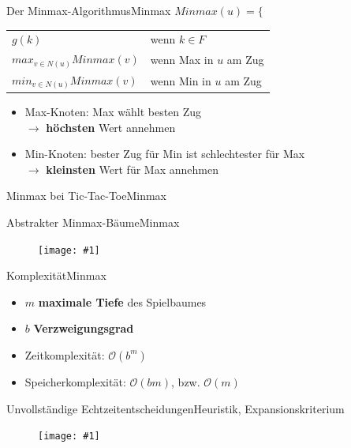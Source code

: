 \documentclass[18pt, aspectratio=169, handout]{beamer}
\newcommand\gw[2]{%
  \begin{figure}[!ht]
  \centering
  \texttt{[image: \#1]}
  {\small#2}
  \end{figure}}
\newcommand\gh[2]{%
  \begin{figure}[!ht]
  \centering
  \texttt{[image: \#1]}
  {\small#2}
  \end{figure}}
\begin{document}
\begin{frame}{Der Minmax-Algorithmus}{Minmax}
$Minmax(u) = \Bigg\{$
	  \begin{tabular}{ll}
		  $g(k)$ & wenn $k \in F$\\
		  $max_{v \in N(u)} Minmax(v)$ & wenn Max in $u$ am Zug\\
		  $min_{v \in N(u)} Minmax(v)$ & wenn Min in $u$ am Zug
	  \end{tabular}

	  \vspace{2\baselineskip}
	  \pause

	\begin{itemize}
    \item
      Max-Knoten: Max wählt besten Zug \\
      $\rightarrow$ \textbf{höchsten} Wert annehmen
    \item
      Min-Knoten: bester Zug für Min ist schlechtester für Max \\
      $\rightarrow$ \textbf{kleinsten} Wert für Max annehmen
  \end{itemize}
\end{frame}

\begin{frame}{Minmax bei Tic-Tac-Toe}{Minmax}
	\only<1>{\gh{img/tic_minmax.pdf}{}}
	\only<2->{\gh{img/tic_minmax_2.pdf}{}}
	\pause
\end{frame}

\begin{frame}{Abstrakter Minmax-Bäume}{Minmax}
	\gw{minmax.pdf}{}
\end{frame}

\begin{frame}{Komplexität}{Minmax}
	\begin{itemize}
		\item
		  $m$ \quad \textbf{maximale Tiefe} des Spielbaumes
		\item
		  $b$ \quad \textbf{Verzweigungsgrad}
		  \pause
		\item
		  Zeitkomplexität: $\mathcal{O}(b^m)$
		\item
		  Speicherkomplexität: $\mathcal{O}(bm)$, bzw. $\mathcal{O}(m)$
	\end{itemize}
\end{frame}



\begin{frame}{Unvollständige Echtzeitentscheidungen}{Heuristik, Expansionskriterium}
  \gw{a/agenda_diagram_Echt.pdf}{}
\end{frame}
\end{document}
